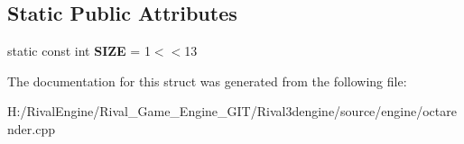 \subsection*{Static Public Attributes}
\begin{DoxyCompactItemize}
\item 
\mbox{\label{structverthash_a807755164bdec8ee6dc0f15aa4a5a1fb}} 
static const int {\bfseries S\+I\+ZE} = 1$<$$<$13
\end{DoxyCompactItemize}


The documentation for this struct was generated from the following file\+:\begin{DoxyCompactItemize}
\item 
H\+:/\+Rival\+Engine/\+Rival\+\_\+\+Game\+\_\+\+Engine\+\_\+\+G\+I\+T/\+Rival3dengine/source/engine/octarender.\+cpp\end{DoxyCompactItemize}
